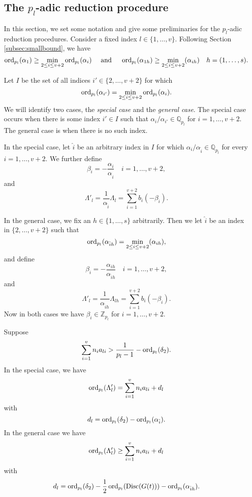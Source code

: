 
\subsection{The $p_l$-adic reduction procedure}

In this section, we set some notation and give some preliminaries for the $p_l$-adic reduction procedures. Consider a fixed index $l \in \{1, \dots, v\}$. Following Section \ref{subsec:smallbound}, we have
\[\operatorname{ord}_{p_l}(\alpha_1) \geq \min_{2\leq i\leq v+2} \operatorname{ord}_{p_l}(\alpha_i) \quad \text{ and } \quad \operatorname{ord}_{p_l}(\alpha_{1h}) \geq \min_{2\leq i\leq v+2}(\alpha_{ih}) \quad h = (1, \dots, s).\]

Let $I$ be the set of all indices $i' \in \{2, \dots, v+2\}$ for which
\[\operatorname{ord}_{p_l}(\alpha_{i'}) = \min_{2\leq i\leq v+2} \operatorname{ord}_{p_l}(\alpha_i).\]
We will identify two cases, the \textit{special case} and the \textit{general case}. The special case occurs when there is some index $i' \in I$ such that $\alpha_i/\alpha_{i'} \in \mathbb{Q}_{p_l}$ for $i = 1, \dots, v+2$. The general case is when there is no such index. 

In the special case, let $\hat{i}$ be an arbitrary index in $I$ for which $\alpha_i/\alpha_{\hat{i}} \in \mathbb{Q}_{p_l}$ for every $i = 1, \dots, v+2$. We further define
\[\beta_i = - \frac{\alpha_i}{\alpha_{\hat{i}}} \quad i = 1, \dots, v+2,\]
and 
\[\Lambda'_l = \frac{1}{\alpha_{\hat{i}}}\Lambda_l = \sum_{i = 1}^{v+2} b_i(-\beta_i).\]

In the general case, we fix an $h \in \{1, \dots, s\}$ arbitrarily. Then we let $\hat{i}$ be an index in $\{2, \dots, v+2\}$ such that 
\[ \operatorname{ord}_{p_l}(\alpha_{\hat{i}h}) = \min_{2\leq i\leq v+2}(\alpha_{ih}),\]
and define
\[\beta_i = - \frac{\alpha_{ih}}{\alpha_{\hat{i}h}} \quad i = 1, \dots, v+2,\]
and 
\[\Lambda'_l = \frac{1}{\alpha_{\hat{i}h}}\Lambda_{lh} = \sum_{i = 1}^{v+2} b_i(-\beta_i).\]
Now in both cases we have $\beta_i \in \mathbb{Z}_{p_l}$ for $i = 1, \dots, v+2$. 

\begin{lemma} \label{Lem:19.1}
Suppose
\[\sum_{i = 1}^v n_{i}a_{li} > \frac{1}{p_l-1} - \operatorname{ord}_{p_l}(\delta_2).\]
In the special case, we have 
\[\operatorname{ord}_{p_l}(\Lambda_l') = \sum_{i = 1}^v n_{i}a_{li} + d_l\]
with
\[d_l = \operatorname{ord}_{p_l}(\delta_2) - \operatorname{ord}_{p_l}(\alpha_{\hat{i}}).\]
In the general case we have
\[\operatorname{ord}_{p_l}(\Lambda_{l}') \geq \sum_{i = 1}^v n_{i}a_{li} + d_l\]
with 
\[d_l = \operatorname{ord}_{p_l}(\delta_2) - \frac{1}{2}\operatorname{ord}_{p_l}(\text{Disc}(G(t))) - \operatorname{ord}_{p_l}(\alpha_{\hat{i}h}).\]
\end{lemma}

